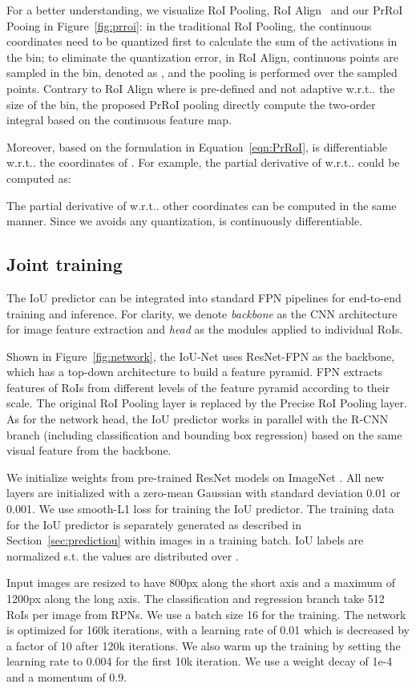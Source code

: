 \documentclass[runningheads]{llncs}
\makeatletter
\DeclareRobustCommand\onedot{\futurelet\@let@token\@onedot}
\def\@onedot{\ifx\@let@token.\else.\null\fi\xspace}
\def\wrt{w.r.t\onedot} \def\dof{d.o.f\onedot}
\makeatother
\begin{document}
For a better understanding, we visualize RoI Pooling, RoI Align~\cite{he2017mask} and our PrRoI Pooing in Figure~\ref{fig:prroi}: in the traditional RoI Pooling, the continuous coordinates need to be quantized first to calculate the sum of the activations in the bin; to eliminate the quantization error, in RoI Align,  continuous points are sampled in the bin, denoted as , and the pooling is performed over the sampled points. Contrary to RoI Align where  is pre-defined and not adaptive \wrt the size of the bin, the proposed PrRoI pooling directly compute the two-order integral based on the continuous feature map.

Moreover, based on the formulation in Equation~\ref{eqn:PrRoI},   is differentiable \wrt the coordinates of . For example, the partial derivative of  \wrt   could be computed as:

The partial derivative of  \wrt other coordinates can be computed in the same manner. Since we avoids any quantization,  is continuously differentiable.
 \subsection{Joint training}
\label{sec:joint}
The IoU predictor can be integrated into standard FPN pipelines for end-to-end training and inference. For clarity, we denote \emph{backbone} as the CNN architecture for image feature extraction and \emph{head} as the modules applied to individual RoIs.

Shown in Figure~\ref{fig:network}, the IoU-Net uses ResNet-FPN \cite{Lin_2017_CVPR} as the backbone, which has a top-down architecture to build a feature pyramid. FPN extracts features of RoIs from different levels of the feature pyramid according to their scale. The original RoI Pooling layer is replaced by the Precise RoI Pooling layer. As for the network head, the IoU predictor works in parallel with the R-CNN branch (including classification and bounding box regression) based on the same visual feature from the backbone.


We initialize weights from pre-trained ResNet models on ImageNet \cite{ILSVRC15}. All new layers are initialized with a zero-mean Gaussian with standard deviation 0.01 or 0.001. We use smooth-L1 loss for training the IoU predictor. The training data for the IoU predictor is separately generated as described in Section~\ref{sec:predictiou} within images in a training batch. IoU labels are normalized s.t. the values are distributed over .

Input images are resized to have 800px along the short axis and a maximum of 1200px along the long axis. The classification and regression branch take 512 RoIs per image from RPNs. We use a batch size 16 for the training. The network is optimized for 160k iterations, with a learning rate of 0.01 which is decreased by a factor of 10 after 120k iterations. We also warm up the training by setting the learning rate to 0.004 for the first 10k iteration. We use a weight decay of 1e-4 and a momentum of 0.9.
\end{document}
